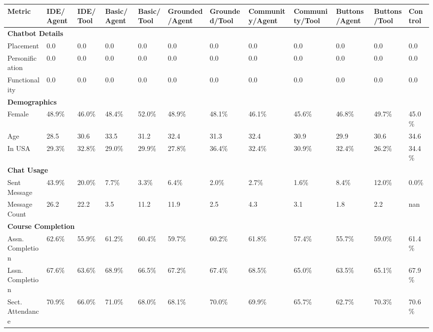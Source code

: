 \begin{table*}[t]
\begin{tcolorbox}[colback=cyan!5!white, colframe=teal!75!black, fonttitle=\bfseries, title=Experiment Groups, boxrule=0.5mm, width=\textwidth]
\begin{center}
\begin{tabularx}{\textwidth}{l|X|X|X|X|X|X|X|X|X|X|X}
\textbf{Metric} & \textbf{IDE/Agent}& \textbf{IDE/Tool}& \textbf{Basic/Agent}& \textbf{Basic/Tool}& \textbf{Grounded/Agent}& \textbf{Grounded/Tool}& \textbf{Community/Agent}& \textbf{Community/Tool}& \textbf{Buttons/Agent}& \textbf{Buttons/Tool}& \textbf{Control}\\
\hline
\multicolumn{12}{l}{\textbf{Chatbot Details}} \\ 
Placement  & 0.0 & 0.0 & 0.0 & 0.0 & 0.0 & 0.0 & 0.0 & 0.0 & 0.0 & 0.0 & 0.0 \\
Personification  & 0.0 & 0.0 & 0.0 & 0.0 & 0.0 & 0.0 & 0.0 & 0.0 & 0.0 & 0.0 & 0.0 \\
Functionality  & 0.0 & 0.0 & 0.0 & 0.0 & 0.0 & 0.0 & 0.0 & 0.0 & 0.0 & 0.0 & 0.0 \\
\hline
\multicolumn{12}{l}{\textbf{Demographics}} \\ 
Female  & 48.9\% & 46.0\% & 48.4\% & 52.0\% & 48.9\% & 48.1\% & 46.1\% & 45.6\% & 46.8\% & 49.7\% & 45.0\% \\
Age  & 28.5 & 30.6 & 33.5 & 31.2 & 32.4 & 31.3 & 32.4 & 30.9 & 29.9 & 30.6 & 34.6 \\
In USA  & 29.3\% & 32.8\% & 29.0\% & 29.9\% & 27.8\% & 36.4\% & 32.4\% & 30.9\% & 32.4\% & 26.2\% & 34.4\% \\
\hline
\multicolumn{12}{l}{\textbf{Chat Usage}} \\ 
Sent Message  & 43.9\% & 20.0\% & 7.7\% & 3.3\% & 6.4\% & 2.0\% & 2.7\% & 1.6\% & 8.4\% & 12.0\% & 0.0\% \\
Message Count  & 26.2 & 22.2 & 3.5 & 11.2 & 11.9 & 2.5 & 4.3 & 3.1 & 1.8 & 2.2 & nan \\
\hline
\multicolumn{12}{l}{\textbf{Course Completion}} \\ 
Assn. Completion  & 62.6\% & 55.9\% & 61.2\% & 60.4\% & 59.7\% & 60.2\% & 61.8\% & 57.4\% & 55.7\% & 59.0\% & 61.4\% \\
Lssn. Completion  & 67.6\% & 63.6\% & 68.9\% & 66.5\% & 67.2\% & 67.4\% & 68.5\% & 65.0\% & 63.5\% & 65.1\% & 67.9\% \\
Sect. Attendance  & 70.9\% & 66.0\% & 71.0\% & 68.0\% & 68.1\% & 70.0\% & 69.9\% & 65.7\% & 62.7\% & 70.3\% & 70.6\% \\

\end{tabularx}
\end{center}
\end{tcolorbox}
\end{table*}
